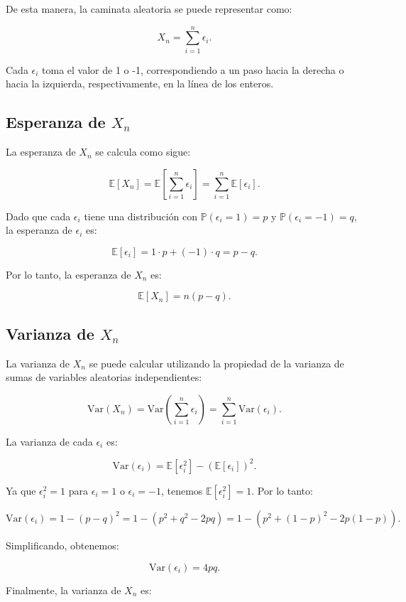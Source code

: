 \documentclass{article}
\begin{document}
De esta manera, la caminata aleatoria se puede representar como:

\[
    X_n = \sum_{i=1}^{n} \epsilon_i.
\]

Cada $\epsilon_i$ toma el valor de 1 o -1, correspondiendo a un paso hacia la derecha o hacia la izquierda, respectivamente, en la línea de los enteros.

\subsection*{Esperanza de $X_n$}

La esperanza de $X_n$ se calcula como sigue:

\[
    \mathbb{E}[X_n] = \mathbb{E}\left[\sum_{i=1}^{n} \epsilon_i\right] = \sum_{i=1}^{n} \mathbb{E}[\epsilon_i].
\]

Dado que cada $\epsilon_i$ tiene una distribución con $\mathbb{P}(\epsilon_i = 1) = p$ y $\mathbb{P}(\epsilon_i = -1) = q$, la esperanza de $\epsilon_i$ es:

\[
    \mathbb{E}[\epsilon_i] = 1\cdot p + (-1)\cdot q = p - q.
\]

Por lo tanto, la esperanza de $X_n$ es:

\[
    \mathbb{E}[X_n] = n(p - q).
\]

\subsection*{Varianza de $X_n$}

La varianza de $X_n$ se puede calcular utilizando la propiedad de la varianza de sumas de variables aleatorias independientes:

\[
    \text{Var}(X_n) = \text{Var}\left(\sum_{i=1}^{n} \epsilon_i\right) = \sum_{i=1}^{n} \text{Var}(\epsilon_i).
\]

La varianza de cada $\epsilon_i$ es:

\[
    \text{Var}(\epsilon_i) = \mathbb{E}[\epsilon_i^2] - (\mathbb{E}[\epsilon_i])^2.
\]

Ya que $\epsilon_i^2 = 1$ para $\epsilon_i = 1$ o $\epsilon_i = -1$, tenemos $\mathbb{E}[\epsilon_i^2] = 1$. Por lo tanto:

\[
    \text{Var}(\epsilon_i) = 1 - (p - q)^2 = 1 - (p^2 + q^2 - 2pq) = 1 - (p^2 + (1-p)^2 - 2p(1-p)).
\]

Simplificando, obtenemos:

\[
    \text{Var}(\epsilon_i) = 4pq.
\]

Finalmente, la varianza de $X_n$ es:
\end{document}

